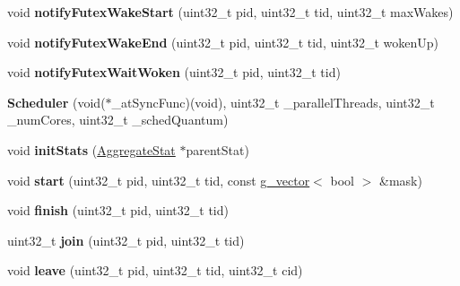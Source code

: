 \begin{DoxyCompactItemize}
\item 
\hypertarget{classScheduler_a468d55223c4d9f35dcef4560af08db02}{void {\bfseries notify\-Futex\-Wake\-Start} (uint32\-\_\-t pid, uint32\-\_\-t tid, uint32\-\_\-t max\-Wakes)}\label{classScheduler_a468d55223c4d9f35dcef4560af08db02}

\item 
\hypertarget{classScheduler_ae753f04c09271e92605bec305a9dc572}{void {\bfseries notify\-Futex\-Wake\-End} (uint32\-\_\-t pid, uint32\-\_\-t tid, uint32\-\_\-t woken\-Up)}\label{classScheduler_ae753f04c09271e92605bec305a9dc572}

\item 
\hypertarget{classScheduler_a3c95a5d0c8b40e411bbe95f249dfaafc}{void {\bfseries notify\-Futex\-Wait\-Woken} (uint32\-\_\-t pid, uint32\-\_\-t tid)}\label{classScheduler_a3c95a5d0c8b40e411bbe95f249dfaafc}

\item 
\hypertarget{classScheduler_a678fa728dd18dc9682bda160eefc71b7}{{\bfseries Scheduler} (void($\ast$\-\_\-at\-Sync\-Func)(void), uint32\-\_\-t \-\_\-parallel\-Threads, uint32\-\_\-t \-\_\-num\-Cores, uint32\-\_\-t \-\_\-sched\-Quantum)}\label{classScheduler_a678fa728dd18dc9682bda160eefc71b7}

\item 
\hypertarget{classScheduler_a3b3f1c768e104463ee975cb6543c59f9}{void {\bfseries init\-Stats} (\hyperlink{classAggregateStat}{Aggregate\-Stat} $\ast$parent\-Stat)}\label{classScheduler_a3b3f1c768e104463ee975cb6543c59f9}

\item 
\hypertarget{classScheduler_ada122eeb910e25f1175acb6d2cbe83d9}{void {\bfseries start} (uint32\-\_\-t pid, uint32\-\_\-t tid, const \hyperlink{classg__vector}{g\-\_\-vector}$<$ bool $>$ \&mask)}\label{classScheduler_ada122eeb910e25f1175acb6d2cbe83d9}

\item 
\hypertarget{classScheduler_a8f7a249370a940ced83b4515d77d7d2d}{void {\bfseries finish} (uint32\-\_\-t pid, uint32\-\_\-t tid)}\label{classScheduler_a8f7a249370a940ced83b4515d77d7d2d}

\item 
\hypertarget{classScheduler_a619b5b66a36bd8bb67cb61eabbceffa5}{uint32\-\_\-t {\bfseries join} (uint32\-\_\-t pid, uint32\-\_\-t tid)}\label{classScheduler_a619b5b66a36bd8bb67cb61eabbceffa5}

\item 
\hypertarget{classScheduler_af07c3a060dc6526314293e50d742e8e1}{void {\bfseries leave} (uint32\-\_\-t pid, uint32\-\_\-t tid, uint32\-\_\-t cid)}\label{classScheduler_af07c3a060dc6526314293e50d742e8e1}


\end{DoxyCompactItemize}
